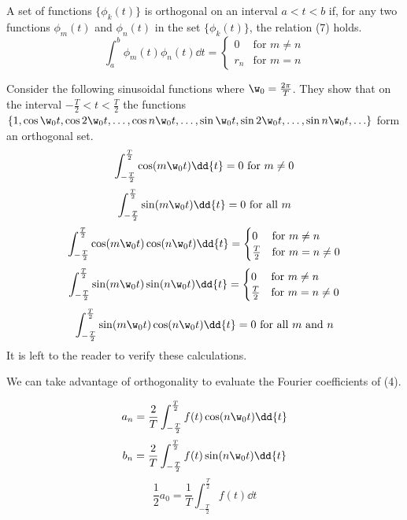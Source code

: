 \begin{defn} A set of functions $\{\phi_k(t)\}$ is orthogonal on an interval $a<t<b$ if, for any two functions $\phi_m(t)$ and $\phi_n(t)$ in the set $\{\phi_k(t)\}$, the relation (7) holds.
\begin{equation}
\int_a^b \phi_m(t)\phi_n(t)\dd{t}= \begin{cases} 0 &\mbox{for } m\neq n \\ r_n & \mbox{for } m=n \end{cases}
\end{equation} \end{defn}

\begin{rem} Consider the following sinusoidal functions where $\w_0=\frac{2\pi}{T}$. They show that on the interval $-\frac{T}{2}<t<\frac T2$ the functions $\{1,\cos\w_0t,\cos2\w_0t,\ldots,\cos n\w_0t,\ldots,\sin\w_0t,\sin2\w_0t,\ldots,\sin n\w_0t,\ldots\}$ form an orthogonal set. \begin{equation} \int_{-\frac T2}^{\frac T2}\cos(m\w_0t)\dd{t}=0 \mbox{ for } m\neq0
\end{equation} \begin{equation} \int_{-\frac T2}^{\frac T2}\sin(m\w_0t)\dd{t}=0 \mbox{ for all } m
\end{equation} \begin{equation} \int_{-\frac T2}^{\frac T2}\cos(m\w_0t)\cos(n\w_0t)\dd{t} =\begin{cases} 0 &\mbox{for } m\neq n \\ \frac T2 & \mbox{for } m=n\neq0 \end{cases}
\end{equation} \begin{equation} \int_{-\frac T2}^{\frac T2}\sin(m\w_0t)\sin(n\w_0t)\dd{t} =\begin{cases} 0 &\mbox{for } m\neq n \\ \frac T2 & \mbox{for } m=n\neq0 \end{cases}
\end{equation} \begin{equation} \int_{-\frac T2}^{\frac T2}\sin(m\w_0t)\cos(n\w_0t)\dd{t} = 0 \mbox{ for all } m \mbox{ and } n
\end{equation} It is left to the reader to verify these calculations. \end{rem}

\begin{coro} We can take advantage of orthogonality to evaluate the Fourier coefficients of (4). \end{coro}
\begin{equation} a_n=\frac 2T\int_{-\frac T2}^{\frac T2}f(t)\cos(n\w_0t)\dd{t}
\end{equation} \begin{equation} b_n=\frac 2T\int_{-\frac T2}^{\frac T2}f(t)\sin(n\w_0t)\dd{t}
\end{equation} 
\begin{equation} \frac 12 a_0=\frac 1T \int_{-\frac T2}^{\frac T2}f(t)\dd{t}
\end{equation}

